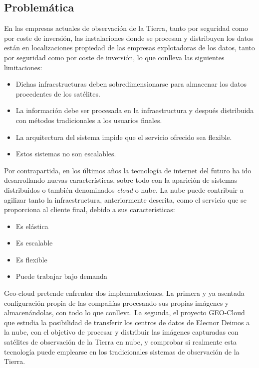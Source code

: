 \subsection{Problemática}
\label{sec:problematica}

En las empresas actuales de observación de la Tierra, tanto por seguridad como por coste de inversión,  las instalaciones donde se procesan y distribuyen los datos están en localizaciones propiedad de las empresas explotadoras de los datos, tanto por seguridad como por coste de inversión, lo que conlleva las siguientes limitaciones:
\begin{itemize}
\item Dichas infraestructuras deben sobredimensionarse para almacenar los datos procedentes de los satélites.
\item La información debe ser procesada en la infraestructura y después distribuida con métodos tradicionales a los usuarios finales.
\item La arquitectura del sistema impide que el servicio ofrecido sea flexible.
\item Estos sistemas no son escalables.
\end{itemize}

Por contrapartida, en los últimos años la tecnología de internet del futuro ha ido desarrollando nuevas características, sobre todo con la aparición de sistemas distribuidos o también denominados \emph{cloud} o nube. La nube puede contribuir a agilizar tanto la infraestructura, anteriormente descrita, como el servicio que se proporciona al cliente final, debido a sus características:
\begin{itemize}
\item Es elástica
\item Es escalable
\item Es flexible
\item Puede trabajar bajo demanda
\end{itemize}

Geo-cloud pretende enfrentar dos implementaciones. La primera y ya asentada configuración propia de las compañías procesando sus propias imágenes y almacenándolas, con todo lo que conlleva.
La segunda, el proyecto GEO-Cloud que estudia la posibilidad de transferir los centros de datos de Elecnor Deimos a la nube, con el objetivo de procesar y distribuir las imágenes capturadas con satélites de observación de la Tierra en nube, y comprobar si realmente esta tecnología puede emplearse en los tradicionales sistemas de observación de la Tierra.


